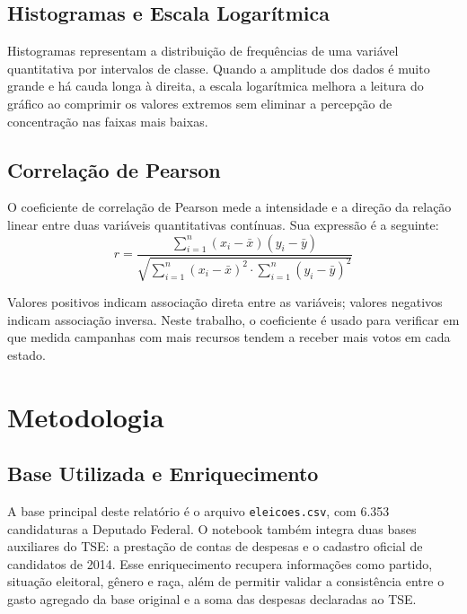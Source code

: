 \documentclass[conference]{IEEEtran}
\begin{document}
\subsection{Histogramas e Escala Logarítmica}

Histogramas representam a distribuição de frequências de uma variável
quantitativa por intervalos de classe. Quando a amplitude dos dados é muito
grande e há cauda longa à direita, a escala logarítmica melhora a leitura do
gráfico ao comprimir os valores extremos sem eliminar a percepção de
concentração nas faixas mais baixas.

\subsection{Correlação de Pearson}

O coeficiente de correlação de Pearson mede a intensidade e a direção da
relação linear entre duas variáveis quantitativas contínuas. Sua expressão é a seguinte:
\begin{equation}
  r = \frac{\sum_{i=1}^{n}(x_i - \bar{x})(y_i - \bar{y})}
           {\sqrt{\sum_{i=1}^{n}(x_i - \bar{x})^2 \cdot
                  \sum_{i=1}^{n}(y_i - \bar{y})^2}}
\end{equation}

Valores positivos indicam associação direta entre as variáveis; valores
negativos indicam associação inversa. Neste trabalho, o coeficiente é usado
para verificar em que medida campanhas com mais recursos tendem a receber
mais votos em cada estado.

\section{Metodologia}

\subsection{Base Utilizada e Enriquecimento}

A base principal deste relatório é o arquivo \texttt{eleicoes.csv}, com
6.353 candidaturas a Deputado Federal. O notebook também integra duas bases
auxiliares do TSE: a prestação de contas de despesas e o cadastro oficial de
candidatos de 2014. Esse enriquecimento recupera informações como partido,
situação eleitoral, gênero e raça, além de permitir validar a consistência
entre o gasto agregado da base original e a soma das despesas declaradas ao
TSE.
\end{document}
